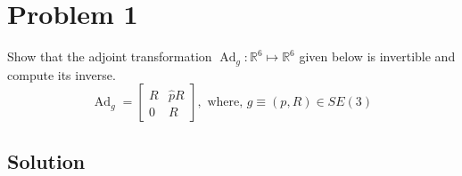 \section*{Problem 1}

Show that the adjoint transformation \( \operatorname{Ad}_{g}: \mathbb{R}^{6} \mapsto \mathbb{R}^{6} \) given below is invertible and compute its inverse.
\[
    \operatorname{Ad}_{g}=\left[\begin{array}{cc}
            R & \widehat{p} R \\
            0 & R
        \end{array}\right], \text { where, } g \equiv(p, R) \in SE(3)
\]

\subsection*{Solution}
